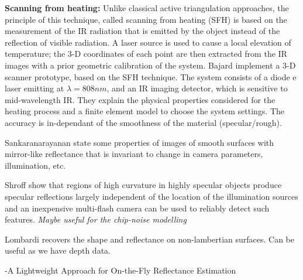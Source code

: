 \textbf{Scanning from heating:}  Unlike classical active triangulation
approaches, the principle of this technique, called scanning
from heating (SFH) is based on the measurement of the IR
radiation that is emitted by the object instead of the reflection
of visible radiation. A laser source is used to cause a local
elevation of temperature; the 3-D coordinates of each point
are then extracted from the IR images with a prior geometric
calibration of the system. Bajard \etal \cite{bajard2012three} implement a 3-D scanner prototype, based on the SFH technique. The system consists of a diode e laser emitting at $\lambda = 808 nm$, and an IR imaging detector, which is sensitive to mid-wavelength IR. They explain the physical properties considered for the heating process and a finite element model to choose the system settings. The accuracy is in-dependant of the smoothness of the material (specular/rough). 


Sankaranarayanan \etal \cite{veeraraghavan2010image} state some properties of images of smooth surfaces with mirror-like reflectance that is invariant to change in camera parameters, illumination, etc.

Shroff \etal \cite{shroff2011finding} show that regions of high curvature in highly
specular objects produce specular reflections largely independent of the location of the illumination sources and an inexpensive multi-flash camera can be used to reliably detect such features. \textit{Maybe useful for the chip-noise modelling}

Lombardi \etal \cite{lombardi2016radiometric} recovers the shape and reflectance on non-lambertian surfaces. Can be useful as we have depth data. 

-A Lightweight Approach for On-the-Fly Reflectance Estimation